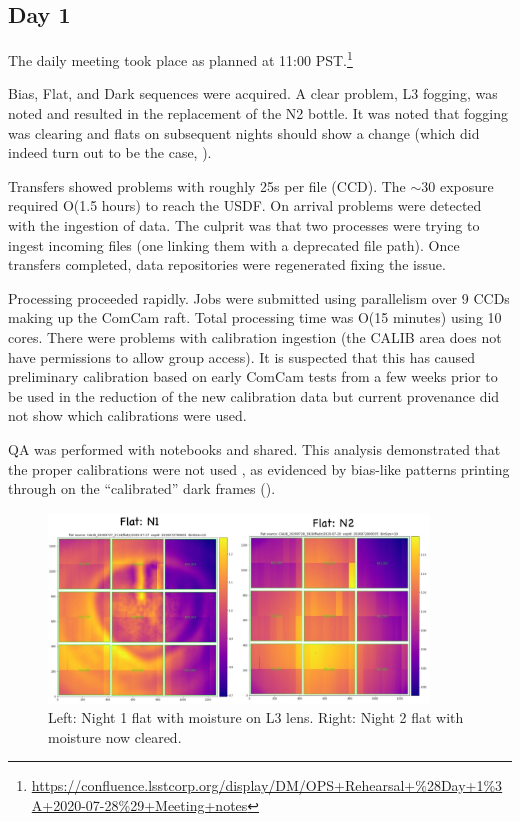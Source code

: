 \subsection{Day 1} \label{sec:day1}

The daily meeting took place as planned at 11:00 PST.\footnote{\url{https://confluence.lsstcorp.org/display/DM/OPS+Rehearsal+\%28Day+1\%3A+2020-07-28\%29+Meeting+notes}}

Bias, Flat, and Dark sequences were acquired.  A clear problem, L3 fogging, was
noted and resulted in the replacement of the N2 bottle.  It was noted that
fogging was clearing and flats on subsequent nights should show a change
(which did indeed turn out to be the case, ).

Transfers showed problems with roughly 25s per file (CCD).  The $\sim$30 exposure
required O(1.5 hours) to reach the USDF.  On arrival problems were detected with
the ingestion of data.  The culprit was that two processes were trying to ingest
incoming files (one linking them with a deprecated file path).  Once transfers
completed, data repositories were regenerated fixing the issue.

Processing proceeded rapidly.  Jobs were submitted using parallelism over 9 CCDs
making up the ComCam raft.  Total processing time was O(15 minutes) using 10 cores.
There were problems with calibration ingestion (the CALIB area does not have
permissions to allow group access).  It is suspected that this has caused preliminary
calibration based on early ComCam tests from a few weeks prior to be used in the
reduction of the new calibration data but current provenance did not show
which calibrations were used.

QA was performed with notebooks  and shared.  This analysis demonstrated that the
proper calibrations were not used , as evidenced by bias-like patterns printing through on the “calibrated” dark frames ().

\begin{figure}
\begin{center}
\includegraphics[width=0.9\textwidth]{figures/n1moist}
\end{center}
\caption{Left: Night 1 flat with moisture on L3 lens.  Right: Night 2 flat with moisture now cleared.\label{fig:d1}}
\end{figure}

